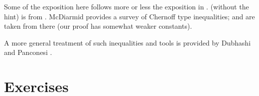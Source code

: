 Some of the exposition here follows more or less the exposition in
\cite{mr-ra-95}.   (without the hint) is from
\cite{m-gd-99}. McDiarmid \cite{m-ombd-89} provides a survey of
Chernoff type inequalities;  and
 are taken from there (our proof has
somewhat weaker constants).


A more general treatment of such inequalities and tools is provided by
Dubhashi and Panconesi \cite{dp-cmara-09}.


\section{Exercises}

